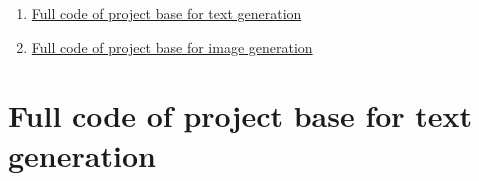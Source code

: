\documentclass[%
pdftex,
oneside,			%
11pt,				%
parskip=half,		%
headheight = 12pt,	%
headsepline,		%
footsepline,		%
footheight = 16pt,	%
abstracton,		%
DIV=calc,		%
BCOR=8mm,		%
headinclude=false,	%
footinclude=false,	%
listof=totoc,		%
toc=bibliography,	%
]{scrreprt}	%
\begin{document}
\cleardoublepage

\appendix

\label{sec:appendix}

{\Large
\begin{enumerate}[label=\Alph*.]
    \item \hyperref[sec:appendix:text-gen]{Full code of project base for text generation}
    \item \hyperref[sec:appendix:image-gen]{Full code of project base for image generation}
\end{enumerate}
}
\pagebreak

\newcommand{\nocontentsline}[3]{}
\newcommand{\tocless}[2]{\bgroup\let\addcontentsline=\nocontentsline#1{#2}\egroup}

\tocless\chapter{Full code of project base for text generation}
\label{sec:appendix:text-gen}
\end{document}

